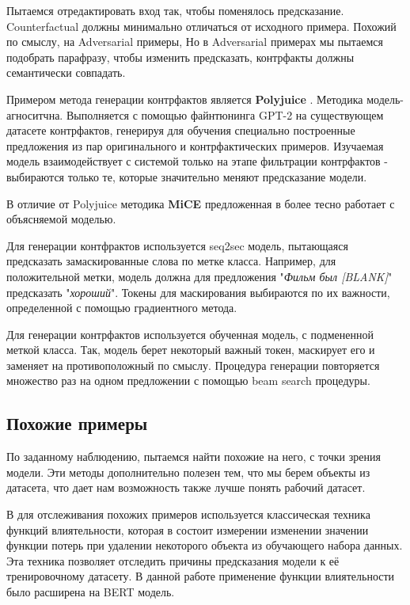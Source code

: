 Пытаемся отредактировать вход так, чтобы поменялось предсказание. Counterfactual должны минимально отличаться от исходного примера.
Похожий по смыслу, на Adversarial примеры, Но в Adversarial примерах мы пытаемся подобрать парафразу, чтобы изменить предсказать, контрфакты должны семантически совпадать.

Примером метода генерации контрфактов является \textbf{Polyjuice} \cite{wuPolyjuiceGeneratingCounterfactuals2021}. Методика модель-агноситчна. Выполняется с помощью файнтюнинга GPT-2 на существующем датасете контрфактов, генерируя для обучения специально построенные предложения из пар оригинального и контрфактических примеров. Изучаемая модель взаимодействует с системой только на этапе фильтрации контрфактов - выбираются только те, которые значительно меняют предсказание модели.

В отличие от Polyjuice методика \textbf{MiCE} предложенная в \cite{rossExplainingNLPModels2021} более тесно работает с объясняемой моделью.

Для генерации контфрактов используется seq2sec модель, пытающаяся предсказать замаскированные слова по метке класса. Например, для положительной метки, модель должна для предложения "\textit{Фильм был [BLANK]}" предсказать  "\textit{хороший}". Токены для маскирования выбираются по их важности, определенной с помощью градиентного метода.

Для генерации контрфактов используется обученная модель, с подмененной меткой класса. Так, модель берет некоторый важный токен, маскирует его и заменяет на противоположный по смыслу. Процедура генерации повторяется множество раз на одном предложении с помощью beam search процедуры.

\vspace{8mm}
\subsection{Похожие примеры}

По заданному наблюдению, пытаемся найти похожие на него, с точки зрения модели. Эти методы дополнительно полезен тем, что мы берем объекты из датасета, что дает нам возможность также лучше понять рабочий датасет.

В \cite{hanExplainingBlackBox2020} для отслеживания похожих примеров используется классическая техника функций влиятельности, которая в состоит измерении изменении значении функции потерь при удалении некоторого объекта из обучающего набора данных. Эта техника позволяет отследить причины предсказания модели к её тренировочному датасету. В данной работе применение функции влиятельности было расширена на BERT модель.

